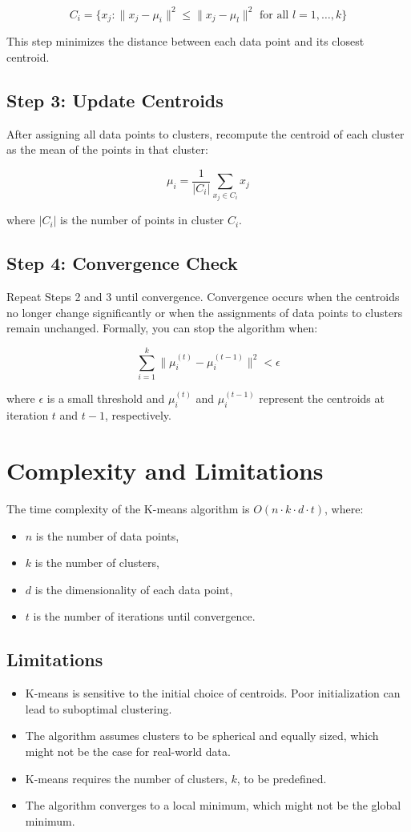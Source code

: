 \documentclass{article}
\begin{document}
\[
C_i = \{ x_j : \|x_j - \mu_i\|^2 \leq \|x_j - \mu_l\|^2 \text{ for all } l = 1, \dots, k \}
\]

This step minimizes the distance between each data point and its closest centroid.

\subsection{Step 3: Update Centroids}
After assigning all data points to clusters, recompute the centroid of each cluster as the mean of the points in that cluster:

\[
\mu_i = \frac{1}{|C_i|} \sum_{x_j \in C_i} x_j
\]

where $|C_i|$ is the number of points in cluster $C_i$.

\subsection{Step 4: Convergence Check}
Repeat Steps 2 and 3 until convergence. Convergence occurs when the centroids no longer change significantly or when the assignments of data points to clusters remain unchanged. Formally, you can stop the algorithm when:

\[
\sum_{i=1}^{k} \|\mu_i^{(t)} - \mu_i^{(t-1)}\|^2 < \epsilon
\]

where $\epsilon$ is a small threshold and $\mu_i^{(t)}$ and $\mu_i^{(t-1)}$ represent the centroids at iteration $t$ and $t-1$, respectively.

\section{Complexity and Limitations}

The time complexity of the K-means algorithm is $O(n \cdot k \cdot d \cdot t)$, where:
\begin{itemize}
    \item $n$ is the number of data points,
    \item $k$ is the number of clusters,
    \item $d$ is the dimensionality of each data point,
    \item $t$ is the number of iterations until convergence.
\end{itemize}

\subsection{Limitations}
\begin{itemize}
    \item K-means is sensitive to the initial choice of centroids. Poor initialization can lead to suboptimal clustering.
    \item The algorithm assumes clusters to be spherical and equally sized, which might not be the case for real-world data.
    \item K-means requires the number of clusters, $k$, to be predefined.
    \item The algorithm converges to a local minimum, which might not be the global minimum.
\end{itemize}
\end{document}
